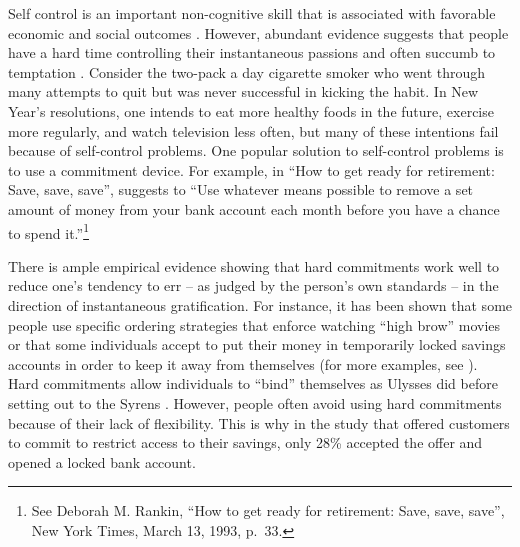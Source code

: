 \documentclass[
]{book}
\begin{document}
Self control is an important non-cognitive skill that is associated with
favorable economic and social outcomes
\citep{laibson1998self, heckman2006effects, alan2015patience}.
However, abundant evidence suggests that people have a hard time controlling
their instantaneous passions and often succumb to temptation \citep{milkman2021film}.
Consider the two-pack a day cigarette smoker who went through many attempts to
quit but was never successful in kicking the habit.
In New Year's resolutions, one intends to eat more healthy foods in the future,
exercise more regularly, and watch television less often, but many of these
intentions fail because of self-control problems.
One popular solution to self-control problems is to use a commitment device.
For example, in ``How to get ready for retirement: Save, save, save'',
\citet{rankin1993get} suggests to ``Use whatever means possible to remove a set amount
of money from your bank account each month before you have a chance to spend
it.''\footnote{See Deborah M. Rankin, ``How to get ready for retirement: Save, save, save'', New York Times, March 13, 1993, p.~33.}

There is ample empirical evidence showing that hard commitments work well to
reduce one's tendency to err -- as judged by the person's own standards -- in
the direction of instantaneous gratification.
For instance, it has been shown that some people use specific ordering
strategies that enforce watching ``high brow'' movies \citep{read1999mixing}
or that some individuals accept to put their money in temporarily locked savings accounts in order to keep it away from themselves (for more examples, see \citet{milkman2021film}).
Hard commitments allow individuals to ``bind'' themselves as Ulysses did before
setting out to the Syrens \citep{elster2000ulysses}.
However, people often avoid using hard commitments because of their lack of
flexibility.
This is why in the \citet{ashraf2006tying} study that offered customers to commit to
restrict access to their savings, only 28\% accepted the offer and opened a
locked bank account.
\end{document}
